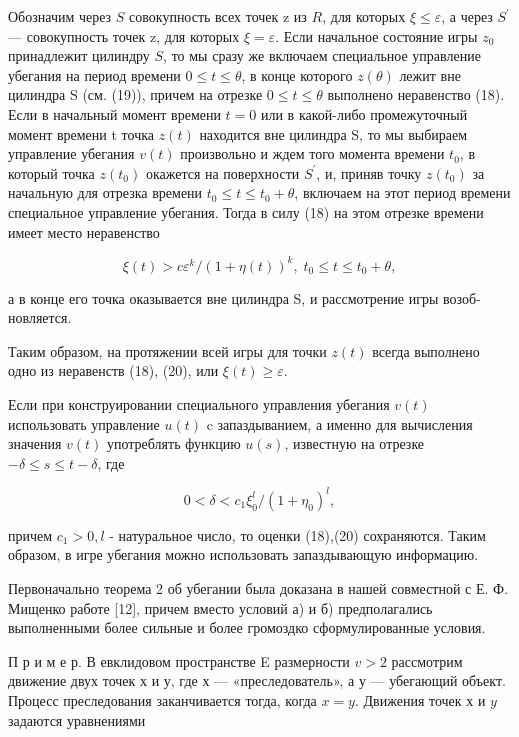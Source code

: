 \documentclass[10pt]{article}
\begin{document}
Обозначим через \(S\) совокупность всех точек z из \(R\), для которых \(\xi \leq \varepsilon\), а через \({S}^{\prime }\) — совокупность точек z, для которых \(\xi = \varepsilon\). Если начальное состояние игры \({z}_{0}\) принадлежит цилиндру \(S\), то мы сразу же включаем специальное управление убегания на период времени \(0 \leq t \leq \theta\), в конце которого \(z\left(\theta\right)\) лежит вне цилиндра S (см. (19)), причем на отрезке \(0 \leq t \leq \theta\) выполнено неравенство (18). Если в начальный момент времени \(t = 0\) или в какой-либо промежуточный момент времени t точка \(z\left(t\right)\) находится вне цилиндра S, то мы выбираем управление убегания \(v\left( t\right)\) произвольно и ждем того момента времени \({t}_{0}\), в который точка \(z\left( {t}_{0}\right)\) окажется на поверхности \({S}^{\prime }\), и, приняв точку \(z\left( {t}_{0}\right)\) за начальную для отрезка времени \({t}_{0} \leq t \leq {t}_{0} + \theta\), включаем на этот период времени специальное управление убегания. Тогда в силу (18) на этом отрезке времени имеет место неравенство

\[
\xi \left( t\right)  > c{\varepsilon }^{k}/{\left( 1 + \eta \left( t\right) \right) }^{k},\;{t}_{0} \leq  t \leq  {t}_{0} + \theta, \tag{20}
\]

а в конце его точка оказывается вне цилиндра S, и рассмотрение игры возоб- новляется.

Таким образом, на протяжении всей игры для точки \(z\left( t\right)\) всегда выполнено одно из неравенств (18), (20), или \(\xi \left( t\right)  \geq  \varepsilon\).

Если при конструировании специального управления убегания \(v\left( t\right)\) использовать управление \(u\left( t\right)\) c запаздыванием, а именно для вычисления значения \(v\left( t\right)\) употреблять функцию \(u\left( s\right)\), известную на отрезке \(-\delta  \leq  s \leq  t - \delta\), где

\[
0 < \delta  < {c}_{1}{\xi }_{0}^{l}/{\left( 1 + {\eta }_{0}\right) }^{l}, \tag{21}
\]

причем \({c}_{1} > 0,l\) - натуральное число, то оценки (18),(20) сохраняются. Таким образом, в игре убегания можно использовать запаздывающую информацию.

Первоначально теорема 2 об убегании была доказана в нашей совместной с Е. Ф. Мищенко работе [12], причем вместо условий а) и б) предполагались выполненными более сильные и более громоздко сформулированные условия.

П р и м е р. В евклидовом пространстве E размерности \(v > 2\) рассмотрим движение двух точек х и у, где х — «преследователь», а у — убегающий объект. Процесс преследования заканчивается тогда, когда \(x = y\). Движения точек х и \(y\) задаются уравнениями
\end{document}
